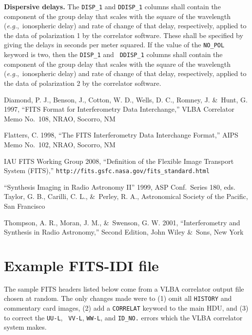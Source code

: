 \documentclass[twoside]{article}
\newcommand{\Me}[1]{\textcolor{mecol}{#1}}
\newcommand{\eg}{{\it e.g.},}
\begin{document}
{\bf Dispersive delays.}  The {\tt DISP\_1} and  {\tt DDISP\_1}
columns shall contain the component of the group delay that scales
with the square of the wavelength (\eg\ ionospheric delay) and rate of
change of that delay, respectively, applied to the data of
polarization 1 by the correlator software.  These shall be specified
by giving the delays \Me{in seconds per meter squared}.  If the value of the
{\tt NO\_POL} keyword is two, then the {\tt DISP\_1} and  {\tt
  DDISP\_1} columns shall contain the component of the group delay
that scales with the square of the wavelength (\eg\ ionospheric delay)
and rate of change of that delay, respectively, applied to the data of
polarization 2 by the correlator software.

\begin{thebibliography}{99}

  Diamond, P. J., Benson, J., Cotton, W. D., Wells, D. C., Romney, J.
  \&\ Hunt, G. 1997, ``FITS Format for Interferometry Data
  Interchange,'' VLBA Correlator Memo No.~108, NRAO, Socorro, NM

   Flatters, C. 1998, ``The FITS Interferometry Data Interchange
   Format,'' AIPS Memo No.~102, NRAO, Socorro, NM

   IAU FITS Working Group 2008, ``Definition of the Flexible Image
   Transport System (FITS),''
   {\tt http://fits.gsfc.nasa.gov/fits\_standard.html}

   ``Synthesis Imaging in Radio Astronomy II'' 1999, ASP Conf.~Series
   180, eds. Taylor, G. B., Carilli, C. L., \&\ Perley, R. A.,
   Astronomical Society of the Pacific, San Francisco

   Thompson, A. R., Moran, J. M., \&\ Swenson, G. W. 2001,
   ``Interferometry and Synthesis in Radio Astronomy,'' Second
   Edition, John Wiley \&\ Sons, New York

\end{thebibliography}

\vfill\eject
\appendix

\section{Example FITS-IDI file}
\label{appendix}

The sample FITS headers listed below come from a VLBA correlator
output file chosen at random.  The only changes made were to (1) omit
all {\tt HISTORY} and commentary card images, (2) add a {\tt CORRELAT}
keyword to the main HDU, and (3) to correct the {\tt UU-L}, {\tt
  VV-L}, {\tt WW-L}, and {\tt ID\_NO.} errors which the VLBA
correlator system makes.
\end{document}
